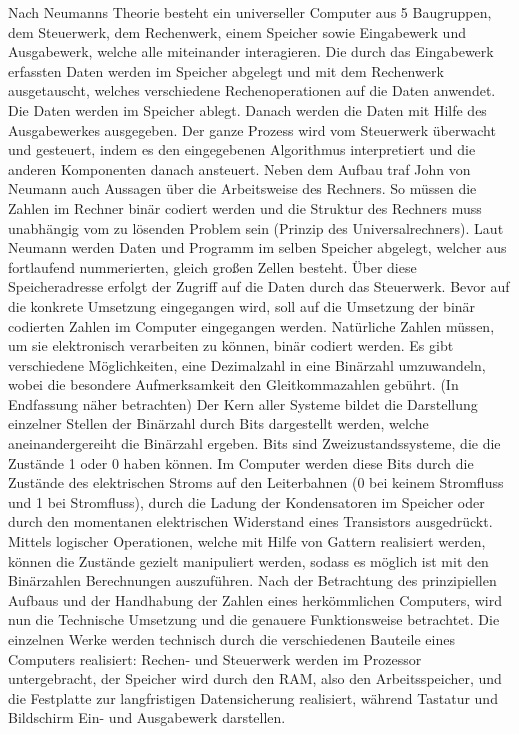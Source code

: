 \documentclass[12pt]{report}
\begin{document}
Nach Neumanns Theorie besteht ein universeller Computer aus 5 Baugruppen, dem Steuerwerk, dem Rechenwerk, einem Speicher sowie Eingabewerk und Ausgabewerk, welche alle miteinander interagieren. Die durch das Eingabewerk erfassten Daten werden im Speicher abgelegt und mit dem Rechenwerk ausgetauscht, welches verschiedene Rechenoperationen auf die Daten anwendet. Die Daten werden im Speicher ablegt. Danach werden die Daten mit Hilfe des Ausgabewerkes ausgegeben. Der ganze Prozess wird vom Steuerwerk überwacht und gesteuert, indem es den eingegebenen Algorithmus interpretiert und die anderen Komponenten danach ansteuert. Neben dem Aufbau traf John von Neumann auch Aussagen über die Arbeitsweise des Rechners. So müssen die Zahlen im Rechner binär codiert werden und die Struktur des Rechners muss unabhängig vom zu lösenden Problem sein (Prinzip des Universalrechners). Laut Neumann werden Daten und Programm im selben Speicher abgelegt, welcher aus fortlaufend nummerierten, gleich großen Zellen besteht. Über diese Speicheradresse erfolgt der Zugriff auf die Daten durch das Steuerwerk. \newline
Bevor auf die konkrete Umsetzung eingegangen wird, soll auf die Umsetzung der binär codierten Zahlen im Computer eingegangen werden.  Natürliche Zahlen müssen, um sie elektronisch verarbeiten zu können, binär codiert werden. Es gibt verschiedene Möglichkeiten, eine Dezimalzahl in eine Binärzahl umzuwandeln, wobei die besondere Aufmerksamkeit den Gleitkommazahlen gebührt. (In Endfassung näher betrachten) Der Kern aller Systeme bildet die Darstellung einzelner Stellen der Binärzahl durch Bits dargestellt werden, welche aneinandergereiht die Binärzahl ergeben. Bits sind Zweizustandssysteme, die die Zustände 1 oder 0 haben können. Im Computer werden diese Bits durch die Zustände des elektrischen Stroms auf den Leiterbahnen (0 bei keinem Stromfluss und 1 bei Stromfluss), durch die Ladung der Kondensatoren im Speicher oder durch den momentanen elektrischen Widerstand eines Transistors ausgedrückt. Mittels logischer Operationen, welche mit Hilfe von Gattern realisiert werden, können die Zustände gezielt manipuliert werden, sodass es möglich ist mit den Binärzahlen Berechnungen auszuführen. \newline
Nach der Betrachtung des prinzipiellen Aufbaus und der Handhabung der Zahlen eines herkömmlichen Computers, wird nun die Technische Umsetzung und die genauere Funktionsweise betrachtet. Die einzelnen Werke werden technisch durch die verschiedenen Bauteile eines Computers realisiert: Rechen- und Steuerwerk werden im Prozessor untergebracht, der Speicher wird durch den RAM, also den Arbeitsspeicher, und die Festplatte zur langfristigen Datensicherung realisiert, während Tastatur und Bildschirm Ein- und Ausgabewerk darstellen. \newline
\end{document}
